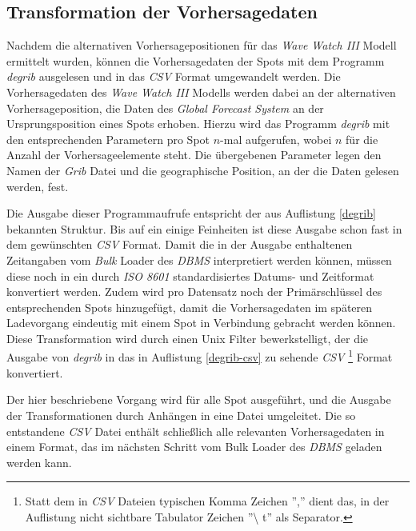\subsection{Transformation der Vorhersagedaten}
Nachdem die alternativen Vorhersagepositionen für das \textit{Wave
  Watch III} Modell ermittelt wurden, können die Vorhersagedaten der
Spots mit dem Programm \textit{degrib} ausgelesen und in das
\textit{CSV} Format umgewandelt werden. Die Vorhersagedaten des
\textit{Wave Watch III} Modells werden dabei an der alternativen
Vorhersageposition, die Daten des \textit{Global Forecast System} an
der Ursprungsposition eines Spots erhoben. Hierzu wird das Programm
\textit{degrib} mit den entsprechenden Parametern pro Spot $n$-mal
aufgerufen, wobei $n$ für die Anzahl der Vorhersageelemente steht. Die
übergebenen Parameter legen den Namen der \textit{Grib} Datei und die
geographische Position, an der die Daten gelesen werden, fest.

Die Ausgabe dieser Programmaufrufe entspricht der aus Auflistung
\ref{degrib} bekannten Struktur. Bis auf ein einige Feinheiten ist
diese Ausgabe schon fast in dem gewünschten \textit{CSV} Format. Damit
die in der Ausgabe enthaltenen Zeitangaben vom \textit{Bulk} Loader
des \textit{DBMS} interpretiert werden können, müssen diese noch in
ein durch \textit{ISO 8601} standardisiertes Datums- und Zeitformat
konvertiert werden. Zudem wird pro Datensatz noch der Primärschlüssel
des entsprechenden Spots hinzugefügt, damit die Vorhersagedaten im
späteren Ladevorgang eindeutig mit einem Spot in Verbindung gebracht
werden können. Diese Transformation wird durch einen Unix Filter
bewerkstelligt, der die Ausgabe von \textit{degrib} in das in
Auflistung \ref{degrib-csv} zu sehende \textit{CSV} \footnote{Statt
  dem in \textit{CSV} Dateien typischen Komma Zeichen '','' dient das,
  in der Auflistung nicht sichtbare Tabulator Zeichen ''\textbackslash
  t'' als Separator.} Format konvertiert.



Der hier beschriebene Vorgang wird für alle Spot ausgeführt, und die
Ausgabe der Transformationen durch Anhängen in eine Datei
umgeleitet. Die so entstandene \textit{CSV} Datei enthält schließlich
alle relevanten Vorhersagedaten in einem Format, das im nächsten
Schritt vom Bulk Loader des \textit{DBMS} geladen werden kann.

